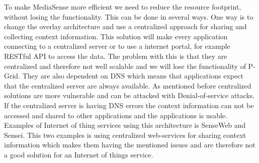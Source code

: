 To make MediaSense more efficient we need to reduce the resource footprint, without losing  the functionality. This can be done in several ways. One way is to change the overlay architecture and use a centralized approach for sharing and collecting context information. This solution will make every application connecting to a centralized server or to use a internet portal, for example RESTful API to access the data. The problem with this is that they are centralized and therefore not well scalable and we will lose the functionality of P-Grid. They are also dependent on DNS which means that applications expect that the centralized server are always available. As mentioned before centralized solutions are more vulnerable and can be attacked with Denial-of-service attacks. If the centralized server is having DNS errors the context information can not be accessed and shared to other applications and the applications is usable. Examples of Internet of thing services using this architecture is SenseWeb and Sensei. This two examples is using centralized web-services for sharing context information which makes them having the mentioned issues and are therefore not a good solution for an Internet of things service. 